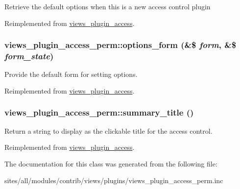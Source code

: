 Retrieve the default options when this is a new access control plugin 

Reimplemented from \hyperlink{classviews__plugin__access_6e5248925c3c3a8059e0a7121bc6777b}{views\_\-plugin\_\-access}.\hypertarget{classviews__plugin__access__perm_f662e29c6b61b1a476b7b9ba368f5650}{
\subsubsection[{options\_\-form}]{\setlength{\rightskip}{0pt plus 5cm}views\_\-plugin\_\-access\_\-perm::options\_\-form (\&\$ {\em form}, \/  \&\$ {\em form\_\-state})}}
\label{classviews__plugin__access__perm_f662e29c6b61b1a476b7b9ba368f5650}


Provide the default form for setting options. 

Reimplemented from \hyperlink{classviews__plugin__access_530865442ea42db5e720e6c49f3d16f2}{views\_\-plugin\_\-access}.\hypertarget{classviews__plugin__access__perm_1e0e33b03ffddf2b98c60740222d8ca5}{
\subsubsection[{summary\_\-title}]{\setlength{\rightskip}{0pt plus 5cm}views\_\-plugin\_\-access\_\-perm::summary\_\-title ()}}
\label{classviews__plugin__access__perm_1e0e33b03ffddf2b98c60740222d8ca5}


Return a string to display as the clickable title for the access control. 

Reimplemented from \hyperlink{classviews__plugin__access_de500a95e599deffa417f8cbdd67bbf4}{views\_\-plugin\_\-access}.

The documentation for this class was generated from the following file:\begin{CompactItemize}
\item 
sites/all/modules/contrib/views/plugins/views\_\-plugin\_\-access\_\-perm.inc\end{CompactItemize}

